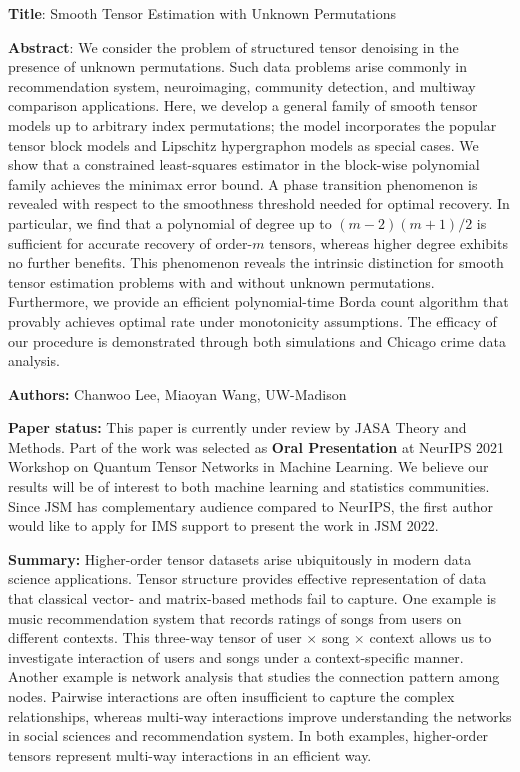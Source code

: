 \documentclass[11pt]{article}
\theoremstyle{definition}
\begin{document}
{\bf \large Title}: Smooth Tensor Estimation with Unknown Permutations

{\bf  \large Abstract}: We consider the problem of structured tensor denoising in the presence of unknown permutations. Such data problems arise commonly in recommendation system, neuroimaging, community detection, and multiway comparison applications. Here, we develop a general family of smooth tensor models up to arbitrary index permutations; the model incorporates the popular tensor block models and Lipschitz hypergraphon models as special cases. We show that a constrained least-squares estimator in the block-wise polynomial family achieves the minimax error bound. A phase transition phenomenon is revealed with respect to the smoothness threshold needed for optimal recovery. In particular, we find that a polynomial of degree up to  $(m-2)(m+1)/2$ is sufficient for accurate recovery of order-$m$ tensors, whereas higher degree exhibits no further benefits. This phenomenon reveals the intrinsic distinction for smooth tensor estimation problems with and without unknown permutations. Furthermore, we provide an efficient polynomial-time Borda count algorithm that provably achieves optimal rate under monotonicity assumptions. The efficacy of our procedure is demonstrated through both simulations and Chicago crime data analysis. 

{\bf \large Authors:} Chanwoo Lee, Miaoyan Wang, UW-Madison

{\bf \large Paper status:} This paper is currently under review by JASA Theory and Methods. Part of the work was selected as {\bf Oral Presentation} at NeurIPS 2021 Workshop on Quantum Tensor Networks in Machine Learning. We believe our results will be of interest to both machine learning and statistics communities. Since JSM has complementary audience compared to NeurIPS, the first author would like to apply for IMS support to present the work in JSM 2022. 

{\bf\large Summary:} Higher-order tensor datasets arise ubiquitously in modern data science applications.
Tensor structure provides effective representation of data that classical vector- and matrix-based methods fail to capture. 
One example is music recommendation system that records ratings of songs from users on different contexts. This three-way tensor of user $\times$ song $\times$ context allows us to investigate interaction of users and songs under a context-specific manner.
Another example is network analysis that studies the connection pattern among nodes.  Pairwise interactions are often insufficient to capture the complex relationships, whereas multi-way interactions improve understanding the networks in social sciences and recommendation system. In both examples, higher-order tensors represent multi-way interactions in an efficient way.
\end{document}

